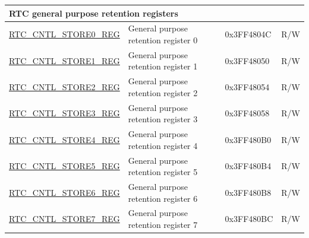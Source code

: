 \begin{longtable}{ | p{6.5cm} | p{6cm} | p{2cm} | p{1cm} | }
\multicolumn{4}{|l|}{\textbf{RTC general purpose retention registers}} \\ \hline
\hyperref[regdesc:RTCCNTLSTOREnREG]{RTC\_CNTL\_STORE0\_REG} & General purpose retention register 0 & 0x3FF4804C & R/W \\ \hline
\hyperref[regdesc:RTCCNTLSTOREnREG]{RTC\_CNTL\_STORE1\_REG} & General purpose retention register 1 & 0x3FF48050 & R/W \\ \hline
\hyperref[regdesc:RTCCNTLSTOREnREG]{RTC\_CNTL\_STORE2\_REG} & General purpose retention register 2 & 0x3FF48054 & R/W \\ \hline
\hyperref[regdesc:RTCCNTLSTOREnREG]{RTC\_CNTL\_STORE3\_REG} & General purpose retention register 3 & 0x3FF48058 & R/W \\ \hline
\hyperref[regdesc:RTCCNTLSTORE1nREG]{RTC\_CNTL\_STORE4\_REG} & General purpose retention register 4 & 0x3FF480B0 & R/W \\ \hline
\hyperref[regdesc:RTCCNTLSTORE1nREG]{RTC\_CNTL\_STORE5\_REG} & General purpose retention register 5 & 0x3FF480B4 & R/W \\ \hline
\hyperref[regdesc:RTCCNTLSTORE1nREG]{RTC\_CNTL\_STORE6\_REG} & General purpose retention register 6 & 0x3FF480B8 & R/W \\ \hline
\hyperref[regdesc:RTCCNTLSTORE1nREG]{RTC\_CNTL\_STORE7\_REG} & General purpose retention register 7 & 0x3FF480BC & R/W \\ \hline




\end{longtable}
